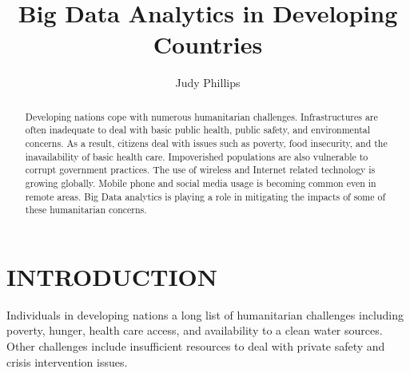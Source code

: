 \documentclass[sigconf]{acmart}
\begin{document}
\title{Big Data Analytics in Developing Countries}


\author{Judy Phillips}

\renewcommand{\shortauthors}{B. Trovato et al.}


\begin{abstract}
Developing nations cope with numerous humanitarian challenges. Infrastructures are often inadequate to deal with basic public health, public safety, and environmental concerns. As a result, citizens deal with issues such as poverty, food insecurity, and the inavailability of basic health care. Impoverished populations are also vulnerable to corrupt government practices. The use of wireless and Internet related technology is growing globally. Mobile phone and social media usage is becoming common even in remote areas. Big Data analytics is playing a role in mitigating the impacts of some of these humanitarian concerns. 
\end{abstract}



\maketitle

\section{INTRODUCTION}

Individuals in developing nations a long list of humanitarian challenges including poverty, hunger, health care access, and availability to a clean water sources. Other challenges include insufficient resources to deal with private safety and crisis intervention issues.
\end{document}
